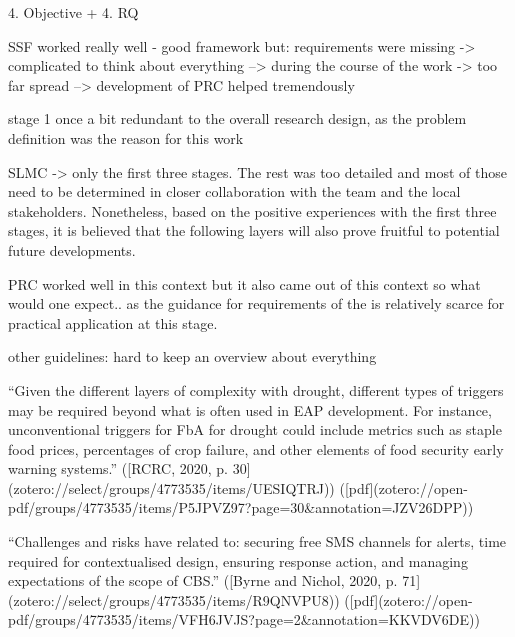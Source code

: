 4. Objective + 4. RQ

SSF worked really well - good framework
but: requirements were missing -> complicated to think about everything --> during the course of the work -> too far spread --> development of PRC helped tremendously

stage 1 once a bit redundant to the overall research design, as the problem definition was the reason for this work


SLMC -> only the first three stages. The rest was too detailed and most of those need to be determined in closer collaboration with the team and the local stakeholders. Nonetheless, based on the positive experiences with the first three stages, it is believed that the following layers will also prove fruitful to potential future developments.

PRC
worked well in this context but it also came out of this context so what would one expect..
as the guidance for requirements of the is relatively scarce for practical application at this stage. 



other guidelines:
hard to keep an overview about everything


“Given the different layers of complexity with drought, different types of triggers may be required beyond what is often used in EAP development. For instance, unconventional triggers for FbA for drought could include metrics such as staple food prices, percentages of crop failure, and other elements of food security early warning systems.” ([RCRC, 2020, p. 30](zotero://select/groups/4773535/items/UESIQTRJ)) ([pdf](zotero://open-pdf/groups/4773535/items/P5JPVZ97?page=30&annotation=JZV26DPP))



“Challenges and risks have related to: securing free SMS channels for alerts, time required for contextualised design, ensuring response action, and managing expectations of the scope of CBS.” ([Byrne and Nichol, 2020, p. 71](zotero://select/groups/4773535/items/R9QNVPU8)) ([pdf](zotero://open-pdf/groups/4773535/items/VFH6JVJS?page=2&annotation=KKVDV6DE))

